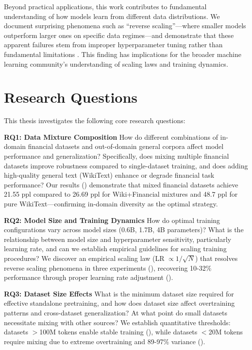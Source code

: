 Beyond practical applications, this work contributes to fundamental understanding of how models learn from different data distributions. We document surprising phenomena such as ``reverse scaling''—where smaller models outperform larger ones on specific data regimes—and demonstrate that these apparent failures stem from improper hyperparameter tuning rather than fundamental limitations \parencite{kaplan2020scaling,hoffmann2022training,mccandlish2018empirical}. This finding has implications for the broader machine learning community's understanding of scaling laws and training dynamics.

\section{Research Questions}

This thesis investigates the following core research questions:

\textbf{RQ1: Data Mixture Composition}
How do different combinations of in-domain financial datasets and out-of-domain general corpora affect model performance and generalization? Specifically, does mixing multiple financial datasets improve robustness compared to single-dataset training, and does adding high-quality general text (WikiText) enhance or degrade financial task performance? Our results () demonstrate that mixed financial datasets achieve 21.55 ppl compared to 26.69 ppl for Wiki+Financial mixtures and 48.7 ppl for pure WikiText—confirming in-domain diversity as the optimal strategy.

\textbf{RQ2: Model Size and Training Dynamics}
How do optimal training configurations vary across model sizes (0.6B, 1.7B, 4B parameters)? What is the relationship between model size and hyperparameter sensitivity, particularly learning rate, and can we establish empirical guidelines for scaling training procedures? We discover an empirical scaling law (LR $\propto 1/\sqrt{N}$) that resolves reverse scaling phenomena in three experiments (), recovering 10-32\% performance through proper learning rate adjustment ().

\textbf{RQ3: Dataset Size Effects}
What is the minimum dataset size required for effective standalone pretraining, and how does dataset size affect overtraining patterns and cross-dataset generalization? At what point do small datasets necessitate mixing with other sources? We establish quantitative thresholds: datasets $>$100M tokens enable stable training (), while datasets $<$20M tokens require mixing due to extreme overtraining and 89-97\% variance ().

